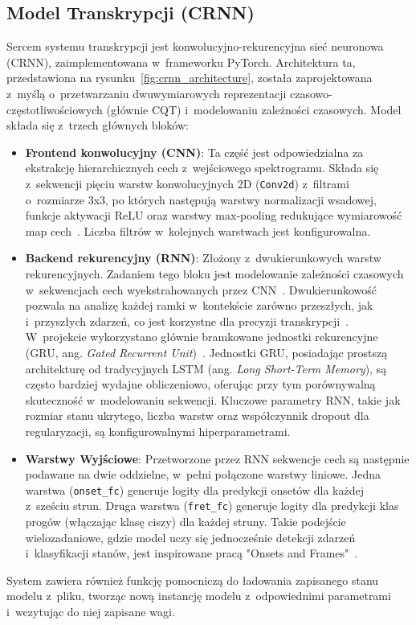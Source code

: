 \subsection{Model Transkrypcji (CRNN)}
\label{ssec:model_transkrypcji_crnn}

Sercem systemu transkrypcji jest konwolucyjno-rekurencyjna sieć neuronowa (CRNN), zaimplementowana w~frameworku PyTorch. Architektura ta, przedstawiona na rysunku~\ref{fig:crnn_architecture}, została zaprojektowana z~myślą o~przetwarzaniu dwuwymiarowych reprezentacji czasowo-częstotliwościowych (głównie CQT) i~modelowaniu zależności czasowych. Model składa się z~trzech głównych bloków:
\begin{itemize}
    \item \textbf{Frontend konwolucyjny (CNN)}: Ta część jest odpowiedzialna za ekstrakcję hierarchicznych cech z~wejściowego spektrogramu. Składa się z~sekwencji pięciu warstw konwolucyjnych 2D (\texttt{Conv2d}) z~filtrami o~rozmiarze 3x3, po których następują warstwy normalizacji wsadowej, funkcje aktywacji ReLU oraz warstwy max-pooling redukujące wymiarowość map cech~\autocite{Wiggins2019TabCNN, BurletHindle2017IsolatedGuitarTranscription}. Liczba filtrów w~kolejnych warstwach jest konfigurowalna.
    \item \textbf{Backend rekurencyjny (RNN)}: Złożony z~dwukierunkowych warstw rekurencyjnych. Zadaniem tego bloku jest modelowanie zależności czasowych w~sekwencjach cech wyekstrahowanych przez CNN~\autocite{Benetos2019AutomaticMusicTranscription}. Dwukierunkowość pozwala na analizę każdej ramki w~kontekście zarówno przeszłych, jak i~przyszłych zdarzeń, co jest korzystne dla precyzji transkrypcji~\autocite{Hawthorne2018Onsets, KlapuriDavy2006SignalProcessing}. W~projekcie wykorzystano głównie bramkowane jednostki rekurencyjne (GRU, ang. \textit{Gated Recurrent Unit})~\autocite{Chung2014GRU}. Jednostki GRU, posiadając prostszą architekturę od tradycyjnych LSTM (ang. \textit{Long Short-Term Memory}), są często bardziej wydajne obliczeniowo, oferując przy tym porównywalną skuteczność w~modelowaniu sekwencji. Kluczowe parametry RNN, takie jak rozmiar stanu ukrytego, liczba warstw oraz współczynnik dropout dla regularyzacji, są konfigurowalnymi hiperparametrami.
    \item \textbf{Warstwy Wyjściowe}: Przetworzone przez RNN sekwencje cech są następnie podawane na dwie oddzielne, w~pełni połączone warstwy liniowe. Jedna warstwa (\texttt{onset\_fc}) generuje logity dla predykcji onsetów dla każdej z~sześciu strun. Druga warstwa (\texttt{fret\_fc}) generuje logity dla predykcji klas progów (włączając klasę ciszy) dla każdej struny. Takie podejście wielozadaniowe, gdzie model uczy się jednocześnie detekcji zdarzeń i~klasyfikacji stanów, jest inspirowane pracą "Onsets and Frames"~\autocite{Hawthorne2018Onsets}.
\end{itemize}
System zawiera również funkcję pomocniczą do ładowania zapisanego stanu modelu z~pliku, tworząc nową instancję modelu z~odpowiednimi parametrami i~wczytując do niej zapisane wagi.

